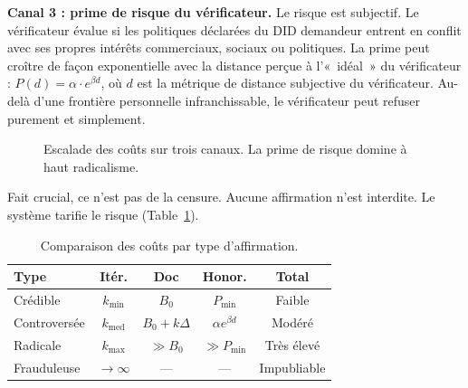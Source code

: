\documentclass[11pt,a4paper,twocolumn]{article}
\begin{document}
\textbf{Canal 3 : prime de risque du vérificateur.} Le risque est subjectif. Le vérificateur évalue si les politiques déclarées du DID demandeur entrent en conflit avec ses propres intérêts commerciaux, sociaux ou politiques. La prime peut croître de façon exponentielle avec la distance perçue à l'«~idéal~» du vérificateur : $P(d) = \alpha \cdot e^{\beta d}$, où $d$ est la métrique de distance subjective du vérificateur. Au-delà d'une frontière personnelle infranchissable, le vérificateur peut refuser purement et simplement.

\begin{figure}[ht]
\centering
{}
\caption{Escalade des coûts sur trois canaux. La prime de risque domine à haut radicalisme.}
\label{fig:radicalism}
\end{figure}

Fait crucial, ce n'est pas de la censure. Aucune affirmation n'est interdite. Le système tarifie le risque (Table~\ref{tab:costs}).

\begin{table}[ht]
\centering
\caption{Comparaison des coûts par type d'affirmation.}
\label{tab:costs}
\footnotesize
\begin{tabular}{@{}lcccc@{}}
\toprule
\textbf{Type} & \textbf{Itér.} & \textbf{Doc} & \textbf{Honor.} & \textbf{Total} \\
\midrule
Crédible & $k_{\min}$ & $B_0$ & $P_{\min}$ & Faible \\
Controversée & $k_{\text{med}}$ & $B_0{+}k\Delta$ & $\alpha e^{\beta d}$ & Modéré \\
Radicale & $k_{\max}$ & $\gg B_0$ & $\gg P_{\min}$ & Très élevé \\
Frauduleuse & $\to\infty$ & --- & --- & Impubliable \\
\bottomrule
\end{tabular}
\end{table}
\end{document}
